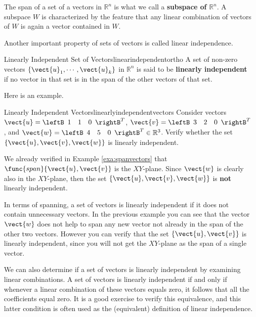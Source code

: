 The span of a set of a vectors in $\mathbb{R}^n$ is what we call a \textbf{subspace of $\mathbb{R}^n$}. A subspace $W$ is characterized by the feature that any linear combination of vectors of $W$ is again a vector contained in $W$. 

Another important property of sets of vectors is called linear independence. 

\begin{definition}{Linearly Independent Set of Vectors}{linearindependentortho}
A set of non-zero vectors $\{ \vect{u}_1, \cdots ,\vect{u}_k\}$ in $\mathbb{R}^{n}$ is said to be 
\textbf{linearly independent} if no vector in that set is in the span of the other vectors of that set.
\end{definition}

Here is an example.  

\begin{example}{Linearly Independent Vectors}{linearlyindependentvectors}
Consider vectors $\vect{u}=\leftB 
\begin{array}{rrr}
1  & 1 & 0
\end{array}
\rightB^T$, 
$\vect{v}=\leftB 
\begin{array}{rrr}
3  & 2 & 0
\end{array}
\rightB^T$, and
$\vect{w}=\leftB 
\begin{array}{rrr}
4  & 5 & 0
\end{array}
\rightB^T  \in \mathbb{R}^{3}$.
Verify whether the set $\{\vect{u}, \vect{v}, \vect{w}\}$ is linearly independent. 
\end{example}

\begin{solution}
We already verified in Example \ref{exa:spanvectors} that
$\func{span} \{\vect{u}, \vect{v} \}$ is the $XY$-plane. Since $\vect{w}$
is clearly also in the $XY$-plane, then the set $\{\vect{u}, \vect{v},
\vect{w}\}$ is \textbf{not} linearly independent.
\end{solution}

In terms of spanning, a set of vectors is linearly independent if it
does not contain unnecessary vectors. In the previous example you
can see that the vector $\vect{w}$ does not help to span any new vector
not already in the span of the other two vectors. However you can
verify that the set $\{\vect{u}, \vect{v}\}$ is linearly independent,
since you will not get the $XY$-plane as the span of a single vector.

We can also determine if a set of vectors is linearly independent by examining linear combinations. A set of vectors is linearly independent if and only if
whenever a linear combination of these vectors equals zero, it follows
that all the coefficients equal zero. It is a good exercise to verify
this equivalence, and this latter condition is often used as the
(equivalent) definition of linear independence.

